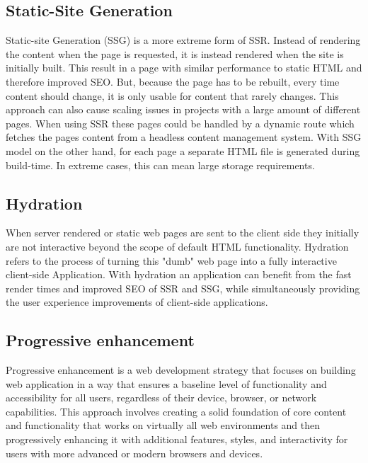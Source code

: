 \subsection{Static-Site Generation}
Static-site Generation (SSG) is a more extreme form of SSR. Instead of rendering the content when the page is requested, it is instead rendered when the site is initially built. This result in a page with similar performance to static HTML and therefore improved SEO. But, because the page has to be rebuilt, every time content should change, it is only usable for content that rarely changes. This approach can also cause scaling issues in projects with a large amount of different pages. When using SSR these pages could be handled by a dynamic route which fetches the pages content from a headless content management system. With SSG model on the other hand, for each page a separate HTML file is generated during build-time. In extreme cases, this can mean large storage requirements. 

\subsection{Hydration}
When server rendered or static web pages are sent to the client side they initially are not interactive beyond the scope of default HTML functionality. Hydration refers to the process of turning this "dumb" web page into a fully interactive client-side Application. With hydration an application can benefit from the fast render times and improved SEO of SSR and SSG, while simultaneously providing the user experience improvements of client-side applications.

\subsection{Progressive enhancement}
Progressive enhancement is a web development strategy that focuses on building web application in a way that ensures a baseline level of functionality and accessibility for all users, regardless of their device, browser, or network capabilities. This approach involves creating a solid foundation of core content and functionality that works on virtually all web environments and then progressively enhancing it with additional features, styles, and interactivity for users with more advanced or modern browsers and devices.

